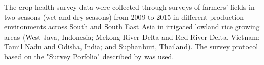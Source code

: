 The crop health survey data were collected through surveys of farmers' fields in two seasons (wet and dry seasons) from 2009 to 2015 in different production environments across South and South East Asia in irrigated lowland rice growing areas (West Java, Indonesia; Mekong River Delta and Red River Delta, Vietnam; Tamil Nadu and Odisha, India; and Suphanburi, Thailand). The survey protocol based on the "Survey Porfolio" described by  was used. %



